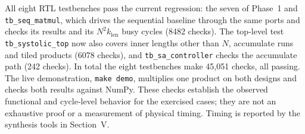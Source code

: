 All eight RTL testbenches pass the current regression: the seven of
Phase~1 and \texttt{tb\_seq\_matmul}, which drives the sequential baseline
through the same ports and checks its results and its $N^2 k_{\mathrm{len}}$
busy cycles (8482 checks). The top-level test \texttt{tb\_systolic\_top} now
also covers inner lengths other than $N$, accumulate runs and tiled
products (6078 checks), and \texttt{tb\_sa\_controller} checks the accumulate path
(242 checks). In total the eight testbenches make 45{,}051 checks, all passing.
The live demonstration, \texttt{make demo}, multiplies one product on both
designs and checks both results against NumPy.
These checks establish the observed functional and cycle-level behavior for the
exercised cases; they are not an exhaustive proof or a measurement of physical
timing. Timing is reported by the synthesis tools in Section~V.
